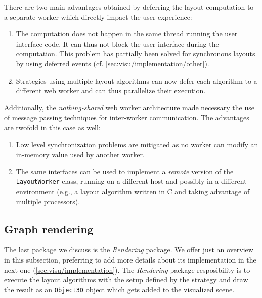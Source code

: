There are two main advantages obtained by deferring the layout computation to a separate worker which directly impact the user experience:

\begin{enumerate}
  \item The computation does not happen in the same thread running the user interface code. It can thus not block the user interface during the computation. This problem has partially been solved for synchronous layouts by using deferred events (cf. \vref{sec:visu/implementation/other}).
  \item Strategies using multiple layout algorithms can now defer each algorithm to a different web worker and can thus parallelize their execution.
\end{enumerate}

Additionally, the \emph{nothing-shared} web worker architecture made necessary the use of message passing techniques for inter-worker communication. The advantages are twofold in this case as well:

\begin{enumerate}
  \item Low level synchronization problems are mitigated as no worker can modify an in-memory value used by another worker.
  \item The same interfaces can be used to implement a \emph{remote} version of the \texttt{LayoutWorker} class, running on a different host and possibly in a different environment (e.g., a layout algorithm written in C and taking advantage of multiple processors).
\end{enumerate}

\subsection{Graph rendering}
\label{sec:visu/design/rendering}

The last package we discuss is the \emph{Rendering} package. We offer just an overview in this subsection, preferring to add more details about its implementation in the next one (\vref*{sec:visu/implementation}). The \emph{Rendering} package resposibility is to execute the layout algorithms with the setup defined by the strategy and draw the result as an \texttt{Object3D} object which gets added to the visualized scene.

